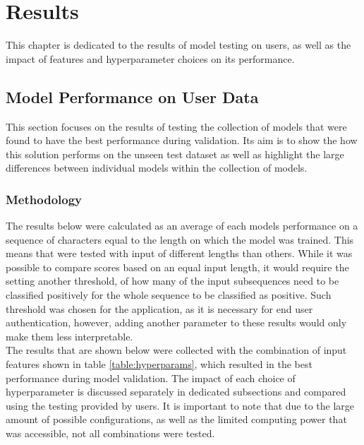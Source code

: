 \chapter{Results}
This chapter is dedicated to the results of model testing on users, as well as the impact of features and hyperparameter choices on its performance. 

\section{Model Performance on User Data}
This section focuses on the results of testing the collection of models that were found to have the best performance during validation. Its aim is to show the how this solution performs on the unseen test dataset as well as highlight the large differences between individual models within the collection of models.

\subsection{Methodology}
The results below were calculated as an average of each models performance on a sequence of characters equal to the length on which the model was trained.
This means that were tested with input of different lengths than others. 
While it was possible to compare scores based on an equal input length,
it would require the setting another threshold, of how many of the input subsequences need to be classified positively for the whole sequence to be classified as positive. 
Such threshold was chosen for the application, as it is necessary for end user authentication, however, adding another parameter to these results would only make them less interpretable.\\
The results that are shown below were collected with the combination of input features shown in table \ref{table:hyperparams}, which resulted in the best performance during model validation. The impact of each choice of hyperparameter is discussed separately in dedicated subsections and compared using the testing provided by users. It is important to note that due to the large amount of possible configurations, as well as the limited computing power that was accessible, not all combinations were tested.

